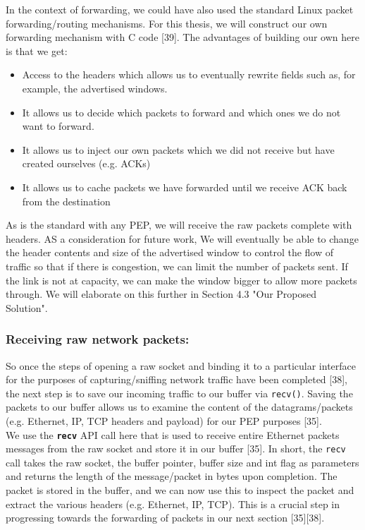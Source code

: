 \documentclass{uathesis}
\begin{document}
In the context of forwarding, we could have also used the standard Linux packet forwarding/routing mechanisms. For this thesis, we will construct our own forwarding mechanism with C code [39]. The advantages of building our own here is that we get: \\

\begin{itemize}
\item Access to the headers which allows us to eventually rewrite fields such as, for example, the advertised windows.
\item It allows us to decide which packets to forward and which ones we do not want to forward. 
\item It allows us to inject our own packets which we did not receive but have created ourselves (e.g. ACKs)
\item It allows us to cache packets we have forwarded until we receive ACK back from the destination \\
\end{itemize}

As is the standard with any PEP, we will receive the raw packets complete with headers. AS a consideration for future work, We will eventually be able to change the header contents and size of the advertised window to control the flow of traffic so that if there is congestion, we can limit the number of packets sent. If the link is not at capacity, we can make the window bigger to allow more packets through. We will elaborate on this further in Section 4.3 "Our Proposed Solution". \\

\subsubsection{Receiving raw network packets:}
So once the steps of opening a raw socket and binding it to a particular interface for the purposes of capturing/sniffing network traffic have been completed [38], the next step is to save our incoming traffic to our buffer via {\tt recv()}. Saving the packets to our buffer allows us to examine the content of the datagrams/packets (e.g. Ethernet, IP, TCP headers and payload) for our PEP purposes [35]. \\

We use the \textbf{\tt recv} API call here that is used to receive entire Ethernet packets messages from the raw socket and store it in our buffer [35]. In short, the {\tt recv} call takes the raw socket, the buffer pointer, buffer size and int flag as parameters and returns the length of the message/packet in bytes upon completion. The packet is stored in the buffer, and we can now use this to inspect the packet and extract the various headers (e.g. Ethernet, IP, TCP). This is a crucial step in progressing towards the forwarding of packets in our next section [35][38].\\
\end{document}
